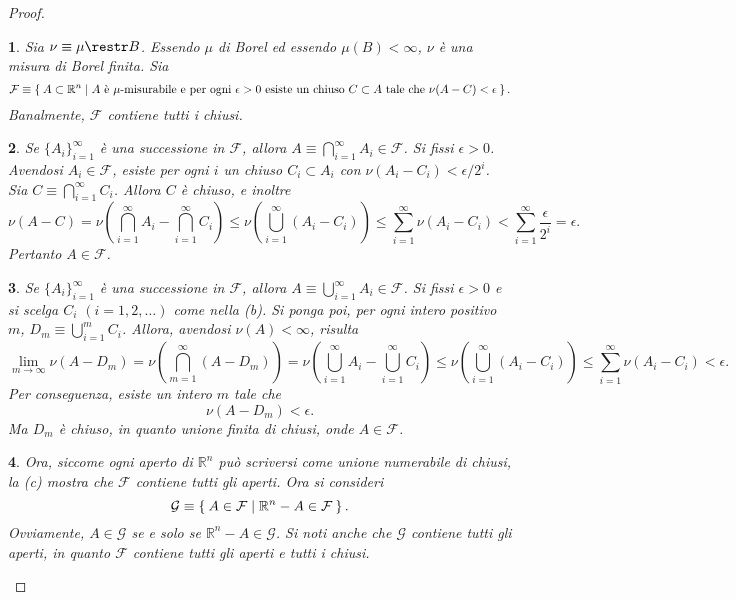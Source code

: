 \documentclass[a4paper,10pt,openright,oneside]{book}
\theoremstyle{theoremstyle}
\theoremstyle{theoremstylewoheader}
\theoremstyle{theoremstyle}
\theoremstyle{proofsecstyle}
\newtheorem{proofsec}{}
\theoremstyle{nonumberplain}
\newtheorem{proof}{Dim.}
\newcommand{\FF}{\ensuremath{\mathcal{F}}}
\newcommand{\GG}{\ensuremath{\mathcal{G}}}
\newcommand{\RR}{\ensuremath{\mathbb{R}}}
\begin{document}
\begin{proof}
\begin{proofsec}
Sia $\nu \equiv \mu \restr B$. Essendo $\mu$ di Borel ed essendo $\mu(B) < \infty$, $\nu$ è una misura di Borel finita. Sia
\[
\FF \equiv \Set{ A \subset \RR^n | \text{$A$ è $\mu$-misurabile e per ogni $\epsilon > 0$ esiste un chiuso $C \subset A$ tale che $\nu(A - C) < \epsilon$} }.
\]
Banalmente, $\FF$ contiene tutti i chiusi.
\end{proofsec}

\begin{proofsec}
\emph{Se $\{A_i\}_{i=1}^\infty$ è una successione in $\FF$, allora $A \equiv \bigcap_{i=1}^\infty A_i \in \FF$.}\hspace{.5em} Si fissi $\epsilon > 0$. Avendosi $A_i \in \FF$, esiste per ogni $i$ un chiuso $C_i \subset A_i$ con $\nu(A_i - C_i) < \epsilon/2^i$. Sia $C \equiv \bigcap_{i=1}^\infty C_i$. Allora $C$ è chiuso, e inoltre
\[
\nu(A - C) = \nu\left(\bigcap_{i=1}^\infty A_i - \bigcap_{i=1}^\infty C_i\right) \le \nu\left(\bigcup_{i=1}^\infty (A_i - C_i)\right)\le \sum_{i=1}^\infty \nu(A_i - C_i) < \sum_{i=1}^\infty \frac{\epsilon}{2^i} = \epsilon.
\]
Pertanto $A \in \FF$.
\end{proofsec}

\begin{proofsec}
\emph{Se $\{A_i\}_{i=1}^\infty$ è una successione in $\FF$, allora $A \equiv \bigcup_{i=1}^\infty A_i \in \FF$.}\hspace{.5em} Si fissi $\epsilon > 0$ e si scelga $C_i$ $(i = 1, 2, \ldots)$ come nella (b). Si ponga poi, per ogni intero positivo $m$, $D_m \equiv \bigcup_{i=1}^m C_i$. Allora, avendosi $\nu(A) < \infty$, risulta
\[
\lim_{m \to \infty} \nu(A - D_m) = \nu\left(\bigcap_{m=1}^\infty (A - D_m)\right) = \nu\left(\bigcup_{i=1}^\infty A_i - \bigcup_{i=1}^\infty C_i\right) \le \nu\left(\bigcup_{i=1}^\infty (A_i - C_i)\right) \le \sum_{i=1}^\infty \nu(A_i - C_i) < \epsilon.
\]
Per conseguenza, esiste un intero $m$ tale che
\[
\nu(A - D_m) < \epsilon.
\]
Ma $D_m$ è chiuso, in quanto unione \emph{finita} di chiusi, onde $A \in \FF$.
\end{proofsec}

\begin{proofsec}
Ora, siccome ogni aperto di $\RR^n$ può scriversi come unione numerabile di chiusi, la (c) mostra che $\FF$ contiene tutti gli aperti. Ora si consideri
\[
\GG \equiv \Set{ A \in \FF | \RR^n - A \in \FF }.
\]
Ovviamente, $A \in \GG$ se e solo se $\RR^n - A \in \GG$. Si noti anche che $\GG$ contiene tutti gli aperti, in quanto $\FF$ contiene tutti gli aperti \emph{e} tutti i chiusi.
\end{proofsec}


\end{proof}
\end{document}

